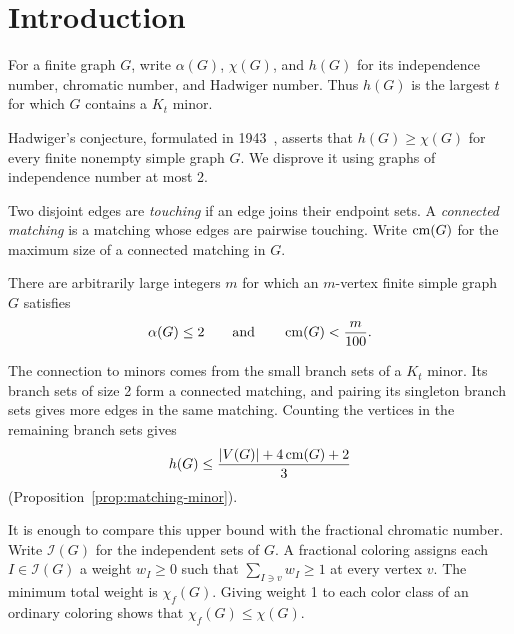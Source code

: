 \section{Introduction}\label{sec:introduction}

For a finite graph \(G\), write \(\alpha(G)\), \(\chi(G)\), and \(h(G)\)
for its independence number, chromatic number, and Hadwiger number.
Thus \(h(G)\) is the largest \(t\) for which \(G\) contains a \(K_t\)
minor.

Hadwiger's conjecture, formulated in 1943~\citep{hadwiger1943},
asserts that \(h(G)\ge\chi(G)\) for every finite nonempty simple
graph \(G\). We disprove it using graphs of independence number
at most 2.

Two disjoint edges are \emph{touching} if an edge joins their
endpoint sets. A \emph{connected matching} is a matching whose edges
are pairwise touching. Write \(\operatorname{cm}(G)\) for the maximum size of a connected matching in \(G\).

\begin{theorem}\label{thm:main}
There are arbitrarily large integers \(m\) for which an \(m\)-vertex
finite simple graph \(G\) satisfies
\[
             \alpha(G)\le2
             \qquad\text{and}\qquad
             \operatorname{cm}(G)<\frac{m}{100}.
\]
\end{theorem}

The connection to minors comes from the small branch sets of a
\(K_t\) minor. Its branch sets of size 2 form a connected matching,
and pairing its singleton branch sets gives more edges in the same
matching. Counting the vertices in the remaining branch sets gives
\[
                    h(G)\le\frac{|V(G)|+4\operatorname{cm}(G)+2}{3}
\]
(Proposition~\ref{prop:matching-minor}).

It is enough to compare this upper bound with the fractional chromatic
number. Write \(\mathcal I(G)\) for the independent sets of \(G\).
A fractional coloring assigns each \(I\in\mathcal I(G)\) a weight
\(w_I\ge0\) such that \(\sum_{I\ni v}w_I\ge1\) at every vertex \(v\).
The minimum total weight is \(\chi_f(G)\). Giving weight 1 to each
color class of an ordinary coloring shows that \(\chi_f(G)\le\chi(G)\).

